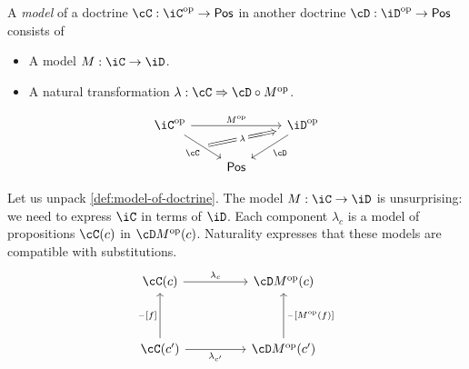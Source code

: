 \documentclass[article,10pt,oneside]{memoir}
\begin{document}
\begin{defn}\label{def:model-of-doctrine}
  A \emph{model} of a doctrine $\cC : \iC\op \to \CPos$ in another doctrine $\cD : \iD\op \to \CPos$ consists of
  \begin{itemize}
  \item A model $M : \iC \to \iD$.
  \item A natural transformation $\lambda : \cC \To \cD \circ M\op$.
  \end{itemize}
  \[\begin{tikzcd}
      \iC\op && \iD\op \\
      & \CPos
      \arrow["M\op", from=1-1, to=1-3]
      \arrow[""{name=0, anchor=center, inner sep=0}, "\cC"', from=1-1, to=2-2]
      \arrow["\cD", from=1-3, to=2-2]
      \arrow["\lambda"{description}, shorten <=4pt, shorten >=4pt, Rightarrow, from=0, to=1-3]
    \end{tikzcd}\]
\end{defn}

Let us unpack \cref{def:model-of-doctrine}.
The model $M : \iC \to \iD$ is unsurprising: we need to express $\iC$ in terms of $\iD$.
Each component $\lambda_{c}$ is a model of propositions $\cC(c)$ in $\cD M\op(c)$.
Naturality expresses that these models are compatible with substitutions. 
\[\begin{tikzcd}
    {\cC(c)} && {\cD M\op(c)} \\
    \\
    {\cC(c')} && {\cD M\op(c')}
    \arrow["{\lambda_{c}}", from=1-1, to=1-3]
    \arrow["{\blank[f]}", from=3-1, to=1-1]
    \arrow["{\blank[M\op(f)]}"', from=3-3, to=1-3]
    \arrow["{\lambda_{c'}}"', from=3-1, to=3-3]
  \end{tikzcd}\]
\end{document}
